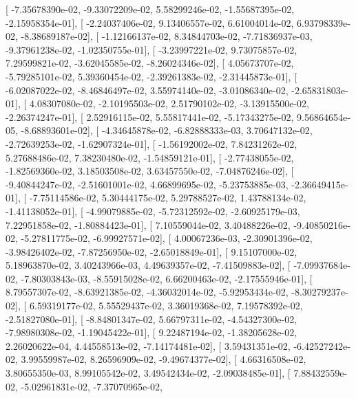 \documentclass{article}
\begin{document}
       [ -7.35678390e-02,  -9.33072209e-02,   5.58299246e-02,
         -1.55687395e-02,  -2.15958354e-01],
       [ -2.24037406e-02,   9.13406557e-02,   6.61004014e-02,
          6.93798339e-02,  -8.38689187e-02],
       [ -1.12166137e-02,   8.34844703e-02,  -7.71836937e-03,
         -9.37961238e-02,  -1.02350755e-01],
       [ -3.23997221e-02,   9.73075857e-02,   7.29599821e-02,
         -3.62045585e-02,  -8.26024346e-02],
       [  4.05673707e-02,  -5.79285101e-02,   5.39360454e-02,
         -2.39261383e-02,  -2.31445873e-01],
       [ -6.02087022e-02,  -8.46846497e-02,   3.55974140e-02,
         -3.01086340e-02,  -2.65831803e-01],
       [  4.08307080e-02,  -2.10195503e-02,   2.51790102e-02,
         -3.13915500e-02,  -2.26374247e-01],
       [  2.52916115e-02,   5.55817441e-02,  -5.17343275e-02,
          9.56864654e-05,  -8.68893601e-02],
       [ -4.34645878e-02,  -6.82888333e-03,   3.70647132e-02,
         -2.72639253e-02,  -1.62907324e-01],
       [ -1.56192002e-02,   7.84231262e-02,   5.27688486e-02,
          7.38230480e-02,  -1.54859121e-01],
       [ -2.77438055e-02,  -1.82569360e-02,   3.18503508e-02,
          3.63457550e-02,  -7.04876246e-02],
       [ -9.40844247e-02,  -2.51601001e-02,   4.66899695e-02,
         -5.23753885e-03,  -2.36649415e-01],
       [ -7.75114586e-02,   5.30444175e-02,   5.29788527e-02,
          1.43788134e-02,  -1.41138052e-01],
       [ -4.99079885e-02,  -5.72312592e-02,  -2.60925179e-03,
          7.22951858e-02,  -1.80884423e-01],
       [  7.10559044e-02,   3.40488226e-02,  -9.40850216e-02,
         -5.27811775e-02,  -6.99927571e-02],
       [  4.00067236e-03,  -2.30901396e-02,  -3.98426402e-02,
         -7.87256950e-02,  -2.65018849e-01],
       [  9.15107000e-02,   5.18963870e-02,   3.40243966e-03,
          4.49639357e-02,  -7.41509883e-02],
       [ -7.09937684e-02,  -7.80303843e-03,  -8.55915028e-02,
          6.66200463e-02,  -2.17555946e-01],
       [  8.79557307e-02,  -8.63921385e-02,  -4.36032014e-02,
         -5.92953434e-02,  -8.30279237e-02],
       [  6.59319177e-02,   5.55529437e-02,   3.36019368e-02,
          7.19578392e-02,  -2.51827080e-01],
       [ -8.84801347e-02,   5.66797311e-02,  -4.54327300e-02,
         -7.98980308e-02,  -1.19045422e-01],
       [  9.22487194e-02,  -1.38205628e-02,   2.26020622e-04,
          4.44558513e-02,  -7.14174481e-02],
       [  3.59431351e-02,  -6.42527242e-02,   3.99559987e-02,
          8.26596909e-02,  -9.49674377e-02],
       [  4.66316508e-02,   3.80655350e-03,   8.99105542e-02,
          3.49542434e-02,  -2.09038485e-01],
       [  7.88432559e-02,  -5.02961831e-02,  -7.37070965e-02,
\end{document}
